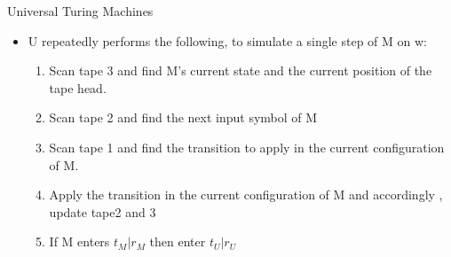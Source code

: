 \documentclass{beamer}
\begin{document}
\begin{frame}{Universal Turing Machines}
	\begin{itemize}
		\item U repeatedly performs the following, to simulate a single step of M on w:
		\begin{enumerate}
			\item Scan tape 3 and find M's current state and the current position of the tape head.
			\item Scan tape 2 and find the next input symbol of M
			\item Scan tape 1 and find the transition to apply in the current configuration of M.
			\item Apply the transition in the current configuration of M and accordingly , update tape2 and 3
			\item If M enters $t_M \big| r_M $ then enter $t_U \big| r_U $
		\end{enumerate}
	\end{itemize}
\end{frame}
\end{document}
